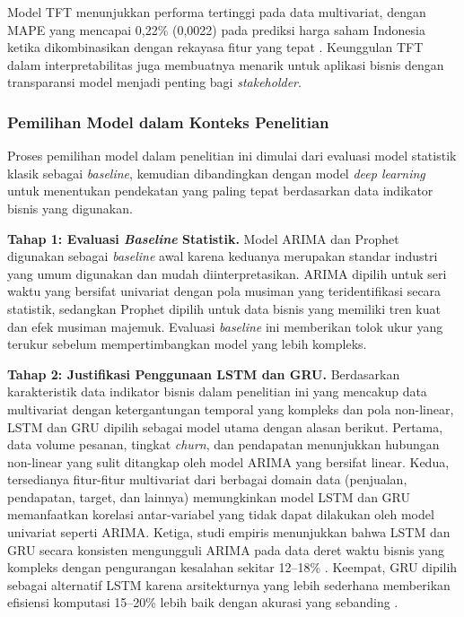 Model TFT menunjukkan performa tertinggi pada data multivariat, dengan MAPE yang mencapai 0{,}22\% (0{,}0022) pada prediksi harga saham Indonesia ketika dikombinasikan dengan rekayasa fitur yang tepat \autocite{Hartanto2024TFTEnhanced}. Keunggulan TFT dalam interpretabilitas juga membuatnya menarik untuk aplikasi bisnis dengan transparansi model menjadi penting bagi \textit{stakeholder}.

\subsubsection{Pemilihan Model dalam Konteks Penelitian}

Proses pemilihan model dalam penelitian ini dimulai dari evaluasi model statistik klasik sebagai \textit{baseline}, kemudian dibandingkan dengan model \textit{deep learning} untuk menentukan pendekatan yang paling tepat berdasarkan data indikator bisnis yang digunakan.

\textbf{Tahap 1: Evaluasi \textit{Baseline} Statistik.} Model ARIMA dan Prophet digunakan sebagai \textit{baseline} awal karena keduanya merupakan standar industri yang umum digunakan dan mudah diinterpretasikan. ARIMA dipilih untuk seri waktu yang bersifat univariat dengan pola musiman yang teridentifikasi secara statistik, sedangkan Prophet dipilih untuk data bisnis yang memiliki tren kuat dan efek musiman majemuk. Evaluasi \textit{baseline} ini memberikan tolok ukur yang terukur sebelum mempertimbangkan model yang lebih kompleks.

\textbf{Tahap 2: Justifikasi Penggunaan LSTM dan GRU.} Berdasarkan karakteristik data indikator bisnis dalam penelitian ini yang mencakup data multivariat dengan ketergantungan temporal yang kompleks dan pola non-linear, LSTM dan GRU dipilih sebagai model utama dengan alasan berikut. Pertama, data volume pesanan, tingkat \textit{churn}, dan pendapatan menunjukkan hubungan non-linear yang sulit ditangkap oleh model ARIMA yang bersifat linear. Kedua, tersedianya fitur-fitur multivariat dari berbagai domain data (penjualan, pendapatan, target, dan lainnya) memungkinkan model LSTM dan GRU memanfaatkan korelasi antar-variabel yang tidak dapat dilakukan oleh model univariat seperti ARIMA. Ketiga, studi empiris menunjukkan bahwa LSTM dan GRU secara konsisten mengungguli ARIMA pada data deret waktu bisnis yang kompleks dengan pengurangan kesalahan sekitar 12--18\% \autocite{Sunendar2025ComparisonARIMALSTMGRU}. Keempat, GRU dipilih sebagai alternatif LSTM karena arsitekturnya yang lebih sederhana memberikan efisiensi komputasi 15--20\% lebih baik dengan akurasi yang sebanding \autocite{Yunita2025NNComparison}.


